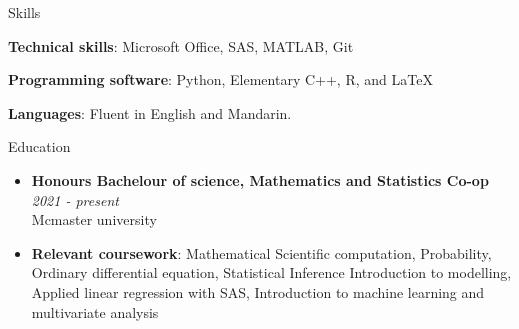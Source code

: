 \documentclass[
	11pt, %
]{resume} %
\begin{document}

\begin{rSection}{Skills}

	\item \textbf{Technical skills}: Microsoft Office, SAS, MATLAB, Git
	\item \textbf{Programming software}: Python, Elementary C++, R, and \LaTeX
	\item \textbf{Languages}: Fluent in English and Mandarin.
\end{rSection}




\begin{rSection}{Education}

	\begin{itemize}
		\item 	\textbf{Honours Bachelour of science, Mathematics and Statistics Co-op} \hfill \textit{2021 - present} \\ 
		Mcmaster university \\
		\item 	\textbf{Relevant coursework}:  Mathematical Scientific computation, 
		Probability, Ordinary differential equation, Statistical Inference Introduction to modelling, Applied linear regression with SAS, Introduction to machine learning and multivariate analysis
	\end{itemize}
	


	
\end{rSection}


\end{document}
